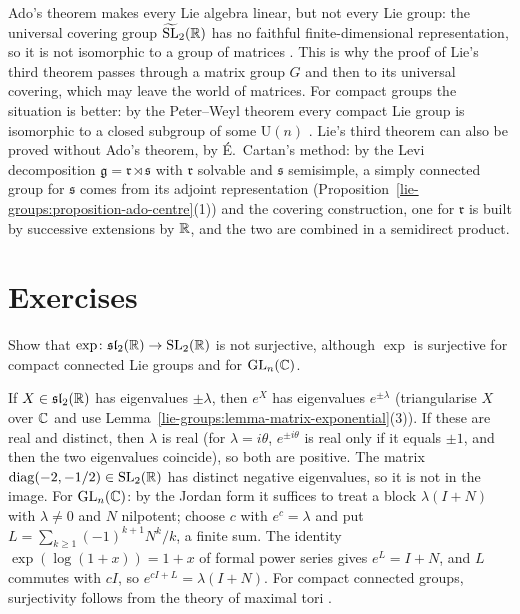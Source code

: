 \begin{remark}\label{lie-groups:remark-linear-groups}
Ado's theorem makes every Lie algebra linear, but not every Lie group: the universal covering group $\widetilde{\mathrm{SL}}_2(\mathbb{R})$ has no faithful finite-dimensional
representation, so it is not isomorphic to a group of matrices \cite{knapp-lie}. This is why the proof of Lie's third theorem passes through a matrix group $G$ and then
to its universal covering, which may leave the world of matrices. For compact groups the situation is better: by the Peter--Weyl theorem every compact Lie group is
isomorphic to a closed subgroup of some $\mathrm{U}(n)$ \cite{brocker-tomdieck}. Lie's third theorem can also be proved without Ado's theorem, by \'E.~Cartan's
method: by the Levi decomposition $\mathfrak{g} = \mathfrak{r} \rtimes \mathfrak{s}$ with $\mathfrak{r}$ solvable and $\mathfrak{s}$ semisimple, a simply connected group for $\mathfrak{s}$
comes from its adjoint representation (Proposition~\ref{lie-groups:proposition-ado-centre}(1)) and the covering construction, one for $\mathfrak{r}$ is built by successive
extensions by $\mathbb{R}$, and the two are combined in a semidirect product.
\end{remark}

\section{Exercises}\label{lie-groups:section-exercises}

\begin{exercise}\label{lie-groups:exercise-exp-not-surjective}
Show that $\exp \colon \mathfrak{sl}_2(\mathbb{R}) \to \mathrm{SL}_2(\mathbb{R})$ is not surjective, although $\exp$ is surjective for compact connected Lie groups and for $\mathrm{GL}_n(\mathbb{C})$.
\end{exercise}

\begin{solution}
If $X \in \mathfrak{sl}_2(\mathbb{R})$ has eigenvalues $\pm\lambda$, then $e^X$ has eigenvalues $e^{\pm\lambda}$ (triangularise $X$ over $\mathbb{C}$ and use
Lemma~\ref{lie-groups:lemma-matrix-exponential}(3)). If these are real and distinct, then $\lambda$ is real (for $\lambda = i\theta$, $e^{\pm i\theta}$ is real
only if it equals $\pm 1$, and then the two eigenvalues coincide), so both are positive. The matrix $\operatorname{diag}(-2, -1/2) \in \mathrm{SL}_2(\mathbb{R})$ has distinct
negative eigenvalues, so it is not in the image. For $\mathrm{GL}_n(\mathbb{C})$: by the Jordan form it suffices to treat a block $\lambda(I + N)$ with $\lambda \neq 0$ and
$N$ nilpotent; choose $c$ with $e^c = \lambda$ and put $L = \sum_{k \geq 1}(-1)^{k+1}N^k/k$, a finite sum. The identity $\exp(\log(1 + x)) = 1 + x$ of formal
power series gives $e^L = I + N$, and $L$ commutes with $cI$, so $e^{cI + L} = \lambda(I + N)$. For compact connected groups, surjectivity follows from the
theory of maximal tori \cite[Chapter IV]{brocker-tomdieck}.
\end{solution}

